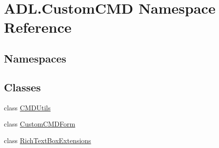 \hypertarget{namespace_a_d_l_1_1_custom_c_m_d}{}\section{A\+D\+L.\+Custom\+C\+MD Namespace Reference}
\label{namespace_a_d_l_1_1_custom_c_m_d}
\subsection*{Namespaces}
\begin{DoxyCompactItemize}
\end{DoxyCompactItemize}
\subsection*{Classes}
\begin{DoxyCompactItemize}
\item 
class \mbox{\hyperlink{class_a_d_l_1_1_custom_c_m_d_1_1_c_m_d_utils}{C\+M\+D\+Utils}}
\item 
class \mbox{\hyperlink{class_a_d_l_1_1_custom_c_m_d_1_1_custom_c_m_d_form}{Custom\+C\+M\+D\+Form}}
\item 
class \mbox{\hyperlink{class_a_d_l_1_1_custom_c_m_d_1_1_rich_text_box_extensions}{Rich\+Text\+Box\+Extensions}}
\end{DoxyCompactItemize}

